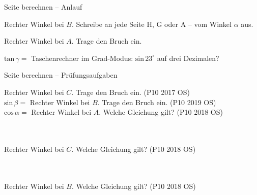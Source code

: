 \setcounter{aufgabe}{33}

\begin{aufgabe}{Seite berechnen – Anlauf}
\begin{teile}
\teil Rechter Winkel bei $B$. Schreibe an jede Seite H, G oder A – vom Winkel $\alpha$ aus.

\teil Rechter Winkel bei $A$. Trage den Bruch ein.

$\mathrm{tan}\,\gamma =$ \leerfeld
\teil Taschenrechner im Grad-Modus: $\mathrm{sin}\,23^\circ$ auf drei Dezimalen? \leerfeld
\end{teile}
\end{aufgabe}

\begin{aufgabe}{Seite berechnen – Prüfungsaufgaben}
\begin{teile}
\teil Rechter Winkel bei $C$. Trage den Bruch ein. \hfill (P10 2017 OS) \\

$\mathrm{sin}\,\beta =$ \leerfeld
\teil Rechter Winkel bei $B$. Trage den Bruch ein. \hfill (P10 2019 OS) \\

$\mathrm{cos}\,\alpha =$ \leerfeld
\teil Rechter Winkel bei $A$. Welche Gleichung gilt? \hfill (P10 2018 OS) \\  \\  \\ 

\teil Rechter Winkel bei $C$. Welche Gleichung gilt? \hfill (P10 2018 OS) \\  \\  \\ 

\teil Rechter Winkel bei $B$. Welche Gleichung gilt? \hfill (P10 2018 OS) \\  \\  \\ 

\end{teile}
\end{aufgabe}

